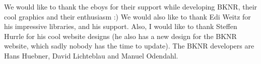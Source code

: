 We would like to thank the eboys for their support while developing
BKNR, their cool graphics and their enthusiasm :) We would also like
to thank Edi Weitz for his impressive libraries, and his
support. Also, I would like to thank Steffen Hurrle for his cool
website designs (he also has a new design for the BKNR website, which
sadly nobody has the time to update). The BKNR developers are Hans
Huebner, David Lichteblau and Manuel Odendahl.

